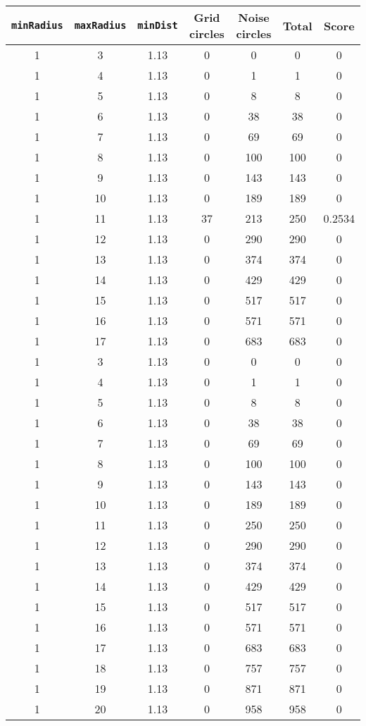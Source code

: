 \documentclass[letterpaper, 12pt]{article}
\begin{document}
\begin{longtable}{|c|c|c|c|c|c|c|}
\hline
\textbf{\texttt{minRadius}} & \textbf{\texttt{maxRadius}} & \textbf{\texttt{minDist}} & \textbf{Grid circles} & \textbf{Noise circles} & \textbf{Total} & \textbf{Score} \\
\hline
1 & 3 & 1.13 & 0 & 0 & 0 & 0 \\
\hline
1 & 4 & 1.13 & 0 & 1 & 1 & 0 \\
\hline
1 & 5 & 1.13 & 0 & 8 & 8 & 0 \\
\hline
1 & 6 & 1.13 & 0 & 38 & 38 & 0 \\
\hline
1 & 7 & 1.13 & 0 & 69 & 69 & 0 \\
\hline
1 & 8 & 1.13 & 0 & 100 & 100 & 0 \\
\hline
1 & 9 & 1.13 & 0 & 143 & 143 & 0 \\
\hline
1 & 10 & 1.13 & 0 & 189 & 189 & 0 \\
\hline
1 & 11 & 1.13 & 37 & 213 & 250 & 0.2534 \\
\hline
1 & 12 & 1.13 & 0 & 290 & 290 & 0 \\
\hline
1 & 13 & 1.13 & 0 & 374 & 374 & 0 \\
\hline
1 & 14 & 1.13 & 0 & 429 & 429 & 0 \\
\hline
1 & 15 & 1.13 & 0 & 517 & 517 & 0 \\
\hline
1 & 16 & 1.13 & 0 & 571 & 571 & 0 \\
\hline
1 & 17 & 1.13 & 0 & 683 & 683 & 0 \\
\hline
1 & 3 & 1.13 & 0 & 0 & 0 & 0 \\
\hline
1 & 4 & 1.13 & 0 & 1 & 1 & 0 \\
\hline
1 & 5 & 1.13 & 0 & 8 & 8 & 0 \\
\hline
1 & 6 & 1.13 & 0 & 38 & 38 & 0 \\
\hline
1 & 7 & 1.13 & 0 & 69 & 69 & 0 \\
\hline
1 & 8 & 1.13 & 0 & 100 & 100 & 0 \\
\hline
1 & 9 & 1.13 & 0 & 143 & 143 & 0 \\
\hline
1 & 10 & 1.13 & 0 & 189 & 189 & 0 \\
\hline
1 & 11 & 1.13 & 0 & 250 & 250 & 0 \\
\hline
1 & 12 & 1.13 & 0 & 290 & 290 & 0 \\
\hline
1 & 13 & 1.13 & 0 & 374 & 374 & 0 \\
\hline
1 & 14 & 1.13 & 0 & 429 & 429 & 0 \\
\hline
1 & 15 & 1.13 & 0 & 517 & 517 & 0 \\
\hline
1 & 16 & 1.13 & 0 & 571 & 571 & 0 \\
\hline
1 & 17 & 1.13 & 0 & 683 & 683 & 0 \\
\hline
1 & 18 & 1.13 & 0 & 757 & 757 & 0 \\
\hline
1 & 19 & 1.13 & 0 & 871 & 871 & 0 \\
\hline
1 & 20 & 1.13 & 0 & 958 & 958 & 0 \\
\hline
\end{longtable}
\end{document}
